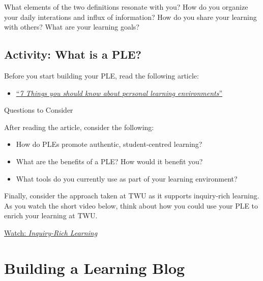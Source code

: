 \documentclass[
]{book}
\providecommand{\tightlist}{%
  \setlength{\itemsep}{0pt}\setlength{\parskip}{0pt}}
\theoremstyle{definition}
\theoremstyle{definition}
\theoremstyle{definition}
\theoremstyle{definition}
\theoremstyle{remark}
\begin{document}
What elements of the two definitions resonate with you? How do you organize your daily interations and influx of information? How do you share your learning with others? What are your learning goals?

\hypertarget{activity-what-is-a-ple}{%
\subsection*{Activity: What is a PLE?}\label{activity-what-is-a-ple}}

\begin{reflect}
Before you start building your PLE, read the following article:

\begin{itemize}
\tightlist
\item
  \href{assets/u4/U4_7-things-you-should-know-about-PLNs.pdf}{``\emph{7 Things you should know about personal learning environments}''}
\end{itemize}

{Questions to Consider}

After reading the article, consider the following:

\begin{itemize}
\tightlist
\item
  How do PLEs promote authentic, student-centred learning?\\
\item
  What are the benefits of a PLE? How would it benefit you?\\
\item
  What tools do you currently use as part of your learning environment?
\end{itemize}

Finally, consider the approach taken at TWU as it supports inquiry-rich learning. As you watch the short video below, think about how you could use your PLE to enrich your learning at TWU.

\href{https://www.youtube.com/watch?v=SCa9Nt3X1vU}{Watch: \emph{Inquiry-Rich Learning}}
\end{reflect}

\hypertarget{building-a-learning-blog}{%
\section{Building a Learning Blog}\label{building-a-learning-blog}}
\end{document}
